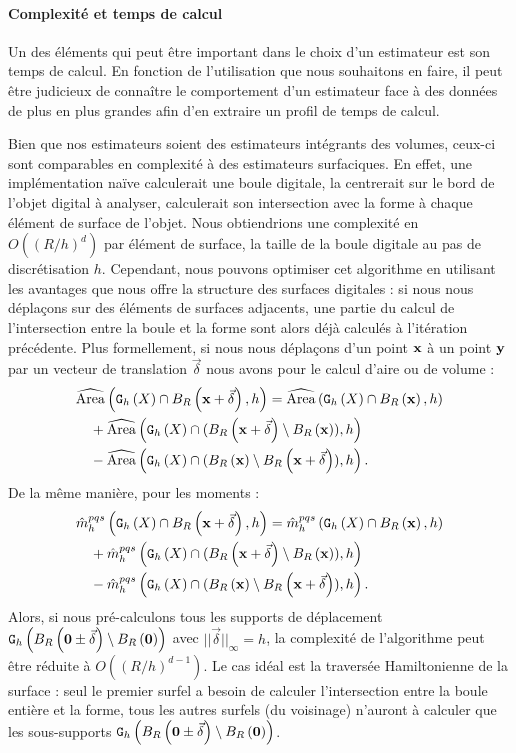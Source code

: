 \paragraph{Complexité et temps de calcul}
\label{sec:complexite}
%
Un des éléments qui peut être important dans le choix d'un estimateur est son
temps de calcul. En fonction de l'utilisation que nous souhaitons en faire, il
peut être judicieux de connaître le comportement d'un estimateur face à des
données de plus en plus grandes afin d'en extraire un profil de temps de calcul.


Bien que nos estimateurs soient des estimateurs intégrants des volumes, ceux-ci
sont comparables en complexité à des estimateurs surfaciques. En effet, une
implémentation naïve calculerait une boule digitale, la centrerait sur le bord
de l'objet digital à analyser, calculerait son intersection avec la forme à
chaque élément de surface de l'objet. Nous obtiendrions une complexité en
$O((R/h)^{d})$ par élément de surface, \cad la taille de la boule digitale au
pas de discrétisation $h$. Cependant, nous pouvons optimiser cet algorithme en
utilisant les avantages que nous offre la structure des surfaces digitales : si
nous nous déplaçons sur des éléments de surfaces adjacents, une partie du calcul
de l'intersection entre la boule et la forme sont alors déjà calculés à
l'itération précédente. Plus formellement, si nous nous déplaçons d'un point
$\vx$ à un point $\vy$ par un vecteur de translation $\vec{\delta}$ %
nous avons pour le calcul d'aire ou de volume :
%
\begin{align}
  & \AreaC\left(\DSh \cap \Ball{R}{\vx + \vec{\delta}}, h\right) =
  \AreaC\left(\DSh \cap \Ball{R}{\vx}, h\right) \\
  &\quad + \AreaC\left(\DSh \cap (\Ball{R}{\vx + \vec{\delta}} \setminus \Ball{R}{\vx} ), h\right) \\
  &\quad - \AreaC\left(\DSh \cap ( \Ball{R}{\vx} \setminus \Ball{R}{\vx + \vec{\delta}}),h\right) .
\end{align}
%
De la même manière, pour les moments :
%
\begin{align}
  & \DMom{pqs}{h}\left(\DSh \cap \Ball{R}{\vx + \vec{\delta}}, h\right) =
  \DMom{pqs}{h}\left(\DSh \cap \Ball{R}{\vx}, h\right) \\
  &\quad + \DMom{pqs}{h}\left(\DSh \cap ( \Ball{R}{\vx+ \vec{\delta}} \setminus \Ball{R}{\vx} ), h\right)\\
  &\quad - \DMom{pqs}{h}\left(\DSh \cap ( \Ball{R}{\vx} \setminus \Ball{R}{\vx+ \vec{\delta}} ), h\right) .
\end{align}
%
Alors, si nous pré-calculons tous les supports de déplacement
$\DigF{\Ball{R}{\mathbf{0} \pm \vec{\delta}} \setminus
\Ball{R}{\mathbf{0}}}{h}$ avec $||\vec{\delta}||_\infty = h$, la complexité de l'algorithme peut être réduite à
$O((R/h)^{d-1})$. Le cas idéal est la traversée Hamiltonienne de la surface :
seul le premier surfel a besoin de calculer l'intersection entre la boule
entière et la forme, tous les autres surfels (du voisinage) n'auront à calculer
que les sous-supports $\DigF{\Ball{R}{\mathbf{0} \pm \vec{\delta}} \setminus
\Ball{R}{\mathbf{0}}}{h}$.


